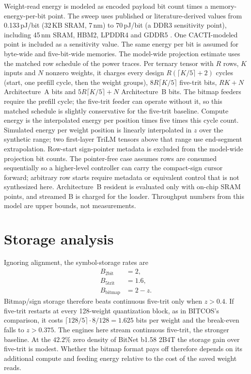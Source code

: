 \documentclass[11pt]{article}
\begin{document}
Weight-read energy is modeled as encoded payload bit count times a memory-energy-per-bit point. The sweep uses published or literature-derived values from 0.133\,pJ/bit (32\,KB SRAM, 7\,nm) to 70\,pJ/bit (a DDR3 sensitivity point), including 45\,nm SRAM, HBM2, LPDDR4 and GDDR5 \cite{horowitz2014energy,oconnor2017fgdram,ha2018dram,jouppi2021tpuv4i,malladi2012memory}. One CACTI-modeled point is included as a sensitivity value. The same energy per bit is assumed for byte-wide and five-bit-wide memories. The model-wide projection estimate uses the matched row schedule of the power traces. Per ternary tensor with $R$ rows, $K$ inputs and $N$ nonzero weights, it charges every design $R(\lceil K/5\rceil+2)$ cycles (start, one prefill cycle, then the weight groups), $8R\lceil K/5\rceil$ five-trit bits, $RK+N$ Architecture~A bits and $5R\lceil K/5\rceil+N$ Architecture~B bits. The bitmap feeders require the prefill cycle; the five-trit feeder can operate without it, so this matched schedule is slightly conservative for the five-trit baseline. Compute energy is the interpolated energy per position times five times this cycle count. Simulated energy per weight position is linearly interpolated in $z$ over the synthetic range; two first-layer TriLM tensors above that range use end-segment extrapolation. Row-start sign-pointer metadata is excluded from the model-wide projection bit counts. The pointer-free case assumes rows are consumed sequentially so a higher-level controller can carry the compact-sign cursor forward; arbitrary row starts require metadata or equivalent control that is not synthesized here. Architecture~B resident is evaluated only with on-chip SRAM points, and streamed B is charged for the loader. Throughput numbers from this model are upper bounds, not measurements.

\section{Storage analysis}

Ignoring alignment, the symbol-storage rates are
\begin{align}
B_{2\mathrm{bit}} &= 2,\\
B_{5\mathrm{trit}} &= 1.6,\\
B_{\mathrm{bitmap}} &= 2-z.
\end{align}
Bitmap/sign storage therefore beats continuous five-trit only when $z>0.4$. If five-trit restarts at every 128-weight quantization block, as in BITCOS's comparison, it costs $\lceil128/5\rceil\cdot8/128=1.625$ bits per weight and the break-even falls to $z>0.375$. The engines here stream continuous five-trit, the stronger baseline. At the $42.2\%$ zero density of BitNet b1.58 2B4T the storage gain over five-trit is modest. Whether the bitmap format pays off therefore depends on its additional compute and feeding energy relative to the cost of the saved weight reads.
\end{document}
